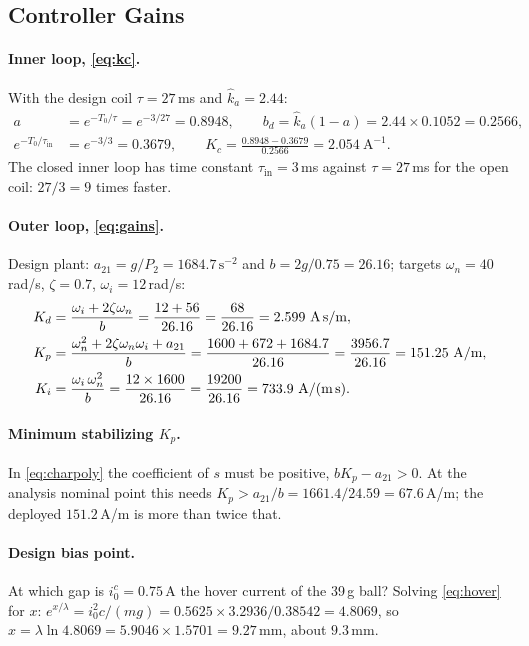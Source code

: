 \documentclass[11pt,a4paper]{article}
\begin{document}
\subsection{Controller Gains}
\label{sec:calc-gains}
\paragraph{Inner loop, \eqref{eq:kc}.} With the design coil $\tau = 27$\,ms and $\hat k_a = 2.44$:
\begin{align*}
a &= e^{-T_0/\tau} = e^{-3/27} = 0.8948, \qquad b_d = \hat k_a(1-a) = 2.44 \times 0.1052 = 0.2566,\\
e^{-T_0/\tau_{\mathrm{in}}} &= e^{-3/3} = 0.3679, \qquad
K_c = \frac{0.8948 - 0.3679}{0.2566} = 2.054\ \text{A}^{-1}.
\end{align*}
The closed inner loop has time constant $\tau_{\mathrm{in}} = 3$\,ms against $\tau = 27$\,ms for the open coil:
$27/3 = 9$ times faster.

\paragraph{Outer loop, \eqref{eq:gains}.} Design plant: $a_{21} = g/P_2 = 1684.7\,\text{s}^{-2}$ and $b = 2g/0.75 = 26.16$;
targets $\omega_n = 40$\,rad/s, $\zeta = 0.7$, $\omega_i = 12$\,rad/s:
\begin{align*}
K_d &= \frac{\omega_i + 2\zeta\omega_n}{b} = \frac{12 + 56}{26.16} = \frac{68}{26.16} = 2.599\ \text{A\,s/m},\\
K_p &= \frac{\omega_n^2 + 2\zeta\omega_n\omega_i + a_{21}}{b} = \frac{1600 + 672 + 1684.7}{26.16} = \frac{3956.7}{26.16}
     = 151.25\ \text{A/m},\\
K_i &= \frac{\omega_i\,\omega_n^2}{b} = \frac{12 \times 1600}{26.16} = \frac{19200}{26.16} = 733.9\ \text{A/(m\,s)}.
\end{align*}

\paragraph{Minimum stabilizing $K_p$.} In \eqref{eq:charpoly} the coefficient of $s$ must be positive, $bK_p - a_{21} > 0$. At
the analysis nominal point this needs $K_p > a_{21}/b = 1661.4/24.59 = 67.6$\,A/m; the deployed $151.2$\,A/m is more than twice
that.

\paragraph{Design bias point.} At which gap is $i_0^c = 0.75$\,A the hover current of the 39\,g ball? Solving \eqref{eq:hover}
for $x$: $e^{x/\lambda} = i_0^2 c/(mg) = 0.5625 \times 3.2936/0.38542 = 4.8069$, so
$x = \lambda \ln 4.8069 = 5.9046 \times 1.5701 = 9.27$\,mm, about $9.3$\,mm.
\end{document}
